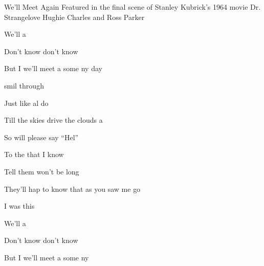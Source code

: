 \begin{SBSong}{We'll Meet Again}
  {Featured in the final scene of Stanley Kubrick's 1964 movie Dr. Strangelove}
  {Hughie Charles and Ross Parker}
  \begin{SBVerse}
    We'll  a

    Don't know  don't know 

    But I  we'll meet a some ny day
  \end{SBVerse}
  \begin{SBVerse}
     smil through

    Just like  al do

    Till the  skies drive the  clouds  a
  \end{SBVerse}
  \begin{SBVerse}
    So will  please say ``Hel''

    To the  that I know

    Tell them  won't be long

    They'll  hap to know that as you saw me go

    I was  this  
  \end{SBVerse}
  \begin{SBVerse}
    We'll  a

    Don't know  don't know 

    But I  we'll meet a some ny 
  \end{SBVerse}
\end{SBSong}
